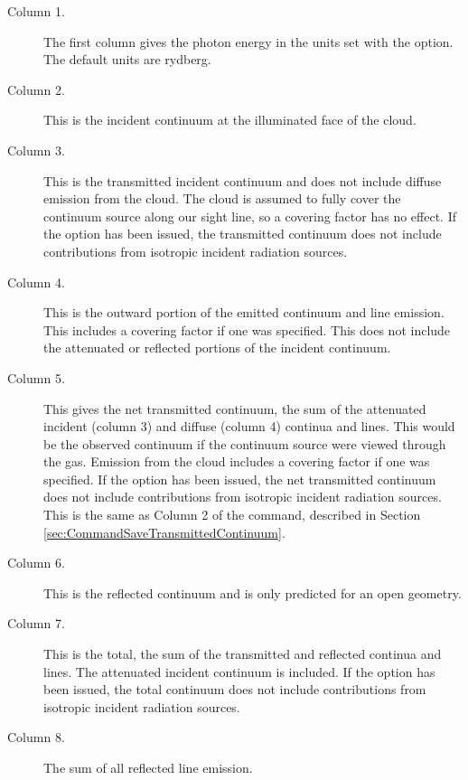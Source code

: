 \begin{description}
\item[Column 1.]  The first column gives the photon energy in the units set
with the  option.  The default
units are rydberg.

\item[Column 2.]  This is the incident continuum at the illuminated face of
the cloud.

\item[Column 3.]  This is the transmitted incident continuum and does not include
diffuse emission from the cloud.
The cloud is assumed to fully cover the continuum source along our sight line, so a covering
factor has no effect.
If the option  has been issued, the transmitted continuum
does not include contributions from isotropic incident radiation sources.

\item[Column 4.]  This is the outward portion of the emitted continuum and line
emission.  This includes a covering factor if one was specified.
This does not include
the attenuated or reflected portions of the incident continuum.

\item[Column 5.]  This gives the net transmitted continuum,
the sum of the
attenuated incident (column 3) and diffuse (column 4) continua and lines.
This would be the observed continuum if the continuum source were viewed
through the gas.  Emission from the cloud includes a covering factor if one was specified.
If the option  has been issued, the net transmitted continuum
does not include contributions from isotropic incident radiation sources.
This is the same as Column 2 of the  command,
described in Section \ref{sec:CommandSaveTransmittedContinuum}.

\item[Column 6.]  This is the reflected continuum
and is only predicted for an open geometry.

\item[Column 7.]  This is the total, the sum of the transmitted and reflected continua
and lines.  The attenuated incident continuum is included.
If the option  has been issued, the total continuum
does not include contributions from isotropic incident radiation sources.

\item[Column 8.] The sum of all reflected line emission.


\end{description}
